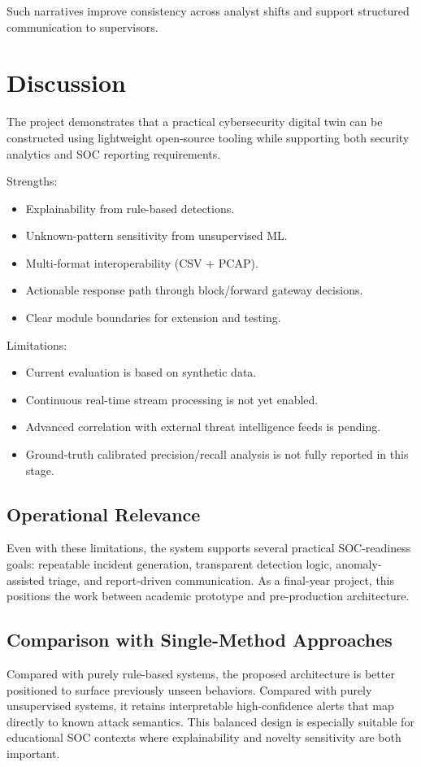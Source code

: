 \documentclass[conference]{IEEEtran}
\begin{document}
Such narratives improve consistency across analyst shifts and support structured communication to supervisors.

\section{Discussion}
The project demonstrates that a practical cybersecurity digital twin can be constructed using lightweight open-source tooling while supporting both security analytics and SOC reporting requirements.

Strengths:
\begin{itemize}
    \item Explainability from rule-based detections.
    \item Unknown-pattern sensitivity from unsupervised ML.
    \item Multi-format interoperability (CSV + PCAP).
    \item Actionable response path through block/forward gateway decisions.
    \item Clear module boundaries for extension and testing.
\end{itemize}

Limitations:
\begin{itemize}
    \item Current evaluation is based on synthetic data.
    \item Continuous real-time stream processing is not yet enabled.
    \item Advanced correlation with external threat intelligence feeds is pending.
    \item Ground-truth calibrated precision/recall analysis is not fully reported in this stage.
\end{itemize}

\subsection{Operational Relevance}
Even with these limitations, the system supports several practical SOC-readiness goals: repeatable incident generation, transparent detection logic, anomaly-assisted triage, and report-driven communication. As a final-year project, this positions the work between academic prototype and pre-production architecture.

\subsection{Comparison with Single-Method Approaches}
Compared with purely rule-based systems, the proposed architecture is better positioned to surface previously unseen behaviors. Compared with purely unsupervised systems, it retains interpretable high-confidence alerts that map directly to known attack semantics. This balanced design is especially suitable for educational SOC contexts where explainability and novelty sensitivity are both important.
\end{document}
